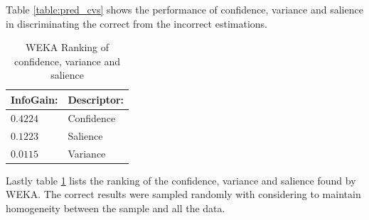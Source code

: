 \documentclass{proc}
\begin{document}
Table \ref{table:pred_cvs} shows the performance of confidence, variance and salience in discriminating the correct from the incorrect estimations.
\begin{table}[h]
    \begin{center}
        \begin{tabular}{ | l | l |}
            \hline
            InfoGain:   &   Descriptor: \\  \hline
            \hline
            $0.4224$    &   Confidence  \\  \hline
            $0.1223$    &   Salience    \\  \hline
            $0.0115$    &   Variance    \\  \hline
        \end{tabular}
        \caption{WEKA Ranking of confidence, variance and salience}
        \label{table:weka_cvs}
    \end{center}
\end{table}
Lastly table \ref{table:weka_cvs} lists the ranking of the confidence, variance and salience found by WEKA. The correct results were sampled randomly with considering to maintain homogeneity between the sample and all the data.
\end{document}
